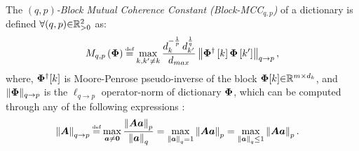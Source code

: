 \begin{Mydefinition}
\label{def:BMIC}
\leftbar
The \emph{$({q,p})$-Block Mutual Coherence Constant (Block-MCC$_{q,p}$)} of a dictionary is defined 
$\forall (q , p) {\in} \mathbb{R}^2_{>0}$ as:	
\begin{equation*}
\begin{aligned}
\label{eq:BMIC}
M_{q,p}\myparanthese{\myPhi} 
\myeq \max_{k,k' \neq k} \frac{d_{k}^{-\frac1p} \, d_{k'}^{\frac1q}}{d_{max}} \mynorm{\myPhi^\dagger\mybracket{k} \myPhi \mybracket{k'}}_{q \to p},
\end{aligned}
\end{equation*}
where, $\boldsymbol{\Phi}^\dagger[k]$ is Moore-Penrose pseudo-inverse of the  block $\boldsymbol{\Phi}[k] {\in} \mathbb{R}^{m {\times} d_k}$, and $\Vert \boldsymbol{\Phi} \Vert_{q \to p}$ is the $\ell_{q {\to} p}$ operator-norm of dictionary $\boldsymbol{\Phi}$, which can be computed through any of the following expressions \cite{Tropp2004b,Golub2013}:
\begin{gather*}
\begin{aligned}
\label{eq:Operator-Norm}
\mynorm{\boldsymbol{A}}_{q \to p} & \myeq 
\max_{\boldsymbol{a} \neq \boldsymbol{0}} \frac{\mynorm{\boldsymbol{A} \boldsymbol{a}}_{p}}{\mynorm{\boldsymbol{a}}_{q}} 
= \max_{\mynorm{\boldsymbol{a}}_q = 1} \mynorm{\boldsymbol{A} \boldsymbol{a}}_{p} = \max_{\mynorm{\boldsymbol{a}}_q \leq 1} \mynorm{\boldsymbol{A} \boldsymbol{a}}_{p}.
\end{aligned}
\end{gather*}
\endleftbar
\end{Mydefinition}